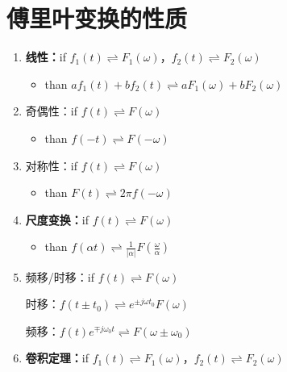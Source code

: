 \documentclass[UTF8]{ctexart}
\begin{document}
\section{傅里叶变换的性质}
\begin{enumerate}[label=(\arabic*),itemindent=0pt,labelindent=\parindent,labelwidth=2em,labelsep=5pt,leftmargin=*]
    \item \textbf{线性：}if $f_1(t)\rightleftharpoons{F_1(\omega)}$，$f_2(t)\rightleftharpoons{F_2(\omega)}$ \par
          \begin{itemize}[label=,left=2.5em]
            \item than $af_1(t)+bf_2(t)\rightleftharpoons{aF_1(\omega)}+bF_2(\omega)$
          \end{itemize}
    \item 奇偶性：if $f(t)\rightleftharpoons{F(\omega)}$ \par
          \begin{itemize}[label=,left=3.5em]
            \item than $f(-t)\rightleftharpoons{F(-\omega)}$
          \end{itemize}
    \item 对称性：if $f(t)\rightleftharpoons{F(\omega)}$ \par
          \begin{itemize}[label=,left=3.5em]
            \item than $F(t)\rightleftharpoons2\pi{f(-\omega)}$
          \end{itemize}
    \item \textbf{尺度变换：}if $f(t)\rightleftharpoons{F(\omega)}$ \par
          \begin{itemize}[label=,left=4.5em]
            \item than $f(\alpha{t})\rightleftharpoons\frac{1}{|\alpha|}{F(\frac{\omega}{\alpha})}$
          \end{itemize}
    \item 频移/时移：if $f(t)\rightleftharpoons{F(\omega)}$ \par
          时移：$f(t\pm{t_0})\rightleftharpoons{e^{\pm{j\omega{t_0}}}F(\omega)}$ \par
          频移：$f(t)e^{\mp{j\omega_0t}}\rightleftharpoons{F(\omega\pm\omega_0)}$ \par
    \item \textbf{卷积定理：}if $f_1(t)\rightleftharpoons{F_1(\omega)}$，$f_2(t)\rightleftharpoons{F_2(\omega)}$ \par

\end{enumerate}
\end{document}
